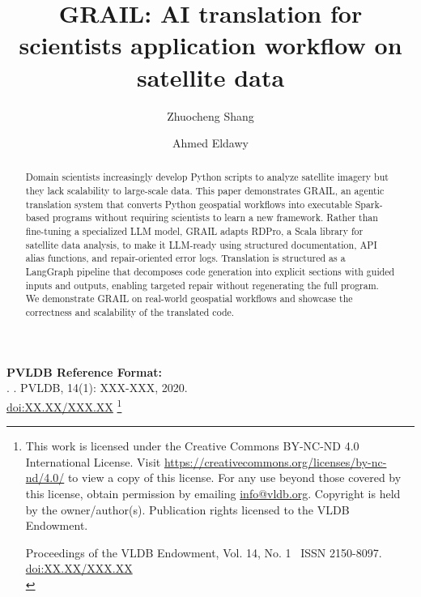 \documentclass[sigconf, nonacm]{acmart}
\newcommand\vldbdoi{XX.XX/XXX.XX}
\newcommand\vldbpages{XXX-XXX}
\newcommand\vldbvolume{14}
\newcommand\vldbissue{1}
\newcommand\vldbyear{2020}
\newcommand\vldbauthors{\authors}
\newcommand\vldbtitle{\shorttitle}
\newcommand\vldbpagestyle{plain}
\begin{document}
\title{GRAIL: AI translation for scientists application workflow on satellite data}
\author{Zhuocheng Shang}

\author{Ahmed Eldawy}

\begin{abstract}
Domain scientists increasingly develop Python scripts to analyze satellite imagery but they lack scalability to large-scale data. This paper demonstrates GRAIL, an agentic translation system that converts Python geospatial workflows into executable Spark-based programs without requiring scientists to learn a new framework. Rather than fine-tuning a specialized LLM model, GRAIL adapts RDPro, a Scala library for satellite data analysis, to make it LLM-ready using structured documentation, API alias functions, and repair-oriented error logs. Translation is structured as a LangGraph pipeline that decomposes code generation into explicit sections with guided inputs and outputs, enabling targeted repair without regenerating the full program. We demonstrate GRAIL on real-world geospatial workflows and showcase the correctness and scalability of the translated code.
\end{abstract}

\maketitle

\pagestyle{\vldbpagestyle}
\begingroup\small\noindent\raggedright\textbf{PVLDB Reference Format:}\\
\vldbauthors. \vldbtitle. PVLDB, \vldbvolume(\vldbissue): \vldbpages, \vldbyear.\\
\href{https://doi.org/\vldbdoi}{doi:\vldbdoi}
\endgroup
\begingroup
\renewcommand\thefootnote{}\footnote{\noindent
This work is licensed under the Creative Commons BY-NC-ND 4.0 International License. Visit \url{https://creativecommons.org/licenses/by-nc-nd/4.0/} to view a copy of this license. For any use beyond those covered by this license, obtain permission by emailing \href{mailto:info@vldb.org}{info@vldb.org}. Copyright is held by the owner/author(s). Publication rights licensed to the VLDB Endowment. \\
\raggedright Proceedings of the VLDB Endowment, Vol. \vldbvolume, No. \vldbissue\ %
ISSN 2150-8097. \\
\href{https://doi.org/\vldbdoi}{doi:\vldbdoi} \\
}\addtocounter{footnote}{-1}\endgroup
\end{document}
